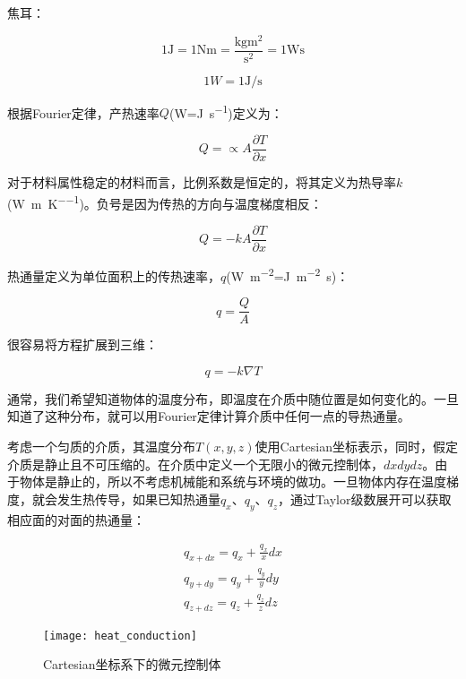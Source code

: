 焦耳：

\[1\si{\joule} = 1\si{\newton\meter} = \frac{\si{\kilogram\meter\squared}}{\si{\second\squared}} = 1\si{\watt\second} \]

\[1W = 1\si{\joule\per\second}\]

根据Fourier定律，产热速率$ Q $(\si{\watt}=\si{\joule\per\second})定义为：

\begin{equation}
Q = \propto A \frac{\partial T}{\partial x}
\end{equation}

对于材料属性稳定的材料而言，比例系数是恒定的，将其定义为热导率$ k $(\si{\watt\per\meter\per\kelvin})。负号是因为传热的方向与温度梯度相反：

\begin{equation}
Q = -k A \frac{\partial T}{\partial x}
\end{equation}

热通量定义为单位面积上的传热速率，$ q $(\si{\watt\per\meter\squared}=\si{\joule\per\meter\squared\second})：

\begin{equation}
q = \frac{Q}{A}
\end{equation}

很容易将方程扩展到三维：

\begin{equation}
q = -k\nabla T
\end{equation}

通常，我们希望知道物体的温度分布，即温度在介质中随位置是如何变化的。一旦知道了这种分布，就可以用Fourier定律计算介质中任何一点的导热通量。

考虑一个匀质的介质，其温度分布$ T(x,y,z) $使用Cartesian坐标表示，同时，假定介质是静止且不可压缩的。在介质中定义一个无限小的微元控制体，$ dxdydz $。由于物体是静止的，所以不考虑机械能和系统与环境的做功。一旦物体内存在温度梯度，就会发生热传导，如果已知热通量$ q_x $、$ q_y $、$ q_z $，通过Taylor级数展开可以获取相应面的对面的热通量：

\begin{gather}
q_{x+dx} = q_x + \frac{q_x}{x}dx \\
q_{y+dy} = q_y + \frac{q_y}{y}dy \\
q_{z+dz} = q_z + \frac{q_z}{z}dz
\end{gather}

\begin{figure}
    \centering
    \texttt{[image: heat\_conduction]}
    \caption{Cartesian坐标系下的微元控制体}
\end{figure}

